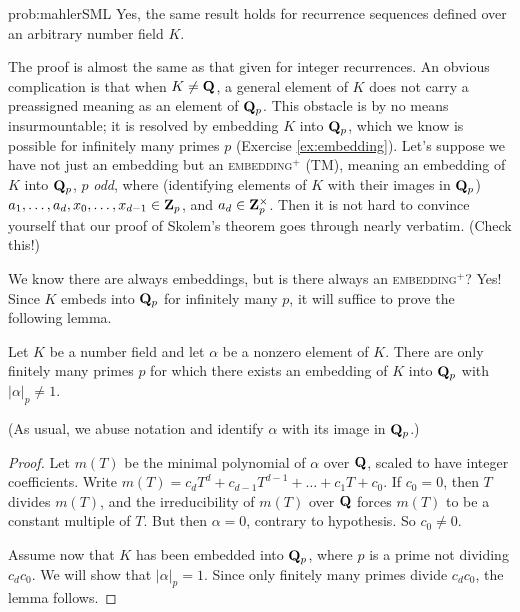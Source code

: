 \begin{sol}{prob:mahlerSML} Yes, the same result holds for recurrence sequences defined over an arbitrary number field $K$. 

The proof is almost the same as that given for integer recurrences.
An obvious complication is that when $K\ne \mathbf{Q}$, a general element of $K$ does not carry a preassigned meaning as an element of $\mathbf{Q}_p$. This obstacle is by no means insurmountable; it is resolved by embedding $K$ into $\mathbf{Q}_p$, which we know is possible for infinitely many primes $p$ (Exercise \ref{ex:embedding}). Let's suppose we have not just an embedding but an \textsc{embedding$^{+}$} (TM), meaning an embedding of $K$ into $\mathbf{Q}_p$, $p$ \emph{odd}, where (identifying elements of $K$ with their images in $\mathbf{Q}_p$) $a_1,\dots, a_d, x_0,\dots, x_{d-1} \in \mathbf{Z}_p$, and $a_d \in \mathbf{Z}_p^{\times}$. Then it is not hard to convince yourself that our proof of Skolem's theorem goes through nearly  verbatim. (Check this!)

We know there are always embeddings, but is there always an \textsc{embedding$^{+}$}? Yes! Since $K$ embeds into $\mathbf{Q}_p$ for infinitely many $p$, it will suffice to prove the following lemma.

\begin{lem} Let $K$ be a number field and let $\alpha$ be a nonzero element of $K$. There are only finitely many primes $p$ for which there exists an embedding of $K$ into $\mathbf{Q}_p$ with $|\alpha|_p\ne 1$. 
\end{lem}
(As usual, we abuse notation and identify $\alpha$ with its image in $\mathbf{Q}_p$.)

\begin{proof} Let $m(T)$ be the minimal polynomial of $\alpha$ over $\mathbf{Q}$, scaled to have integer coefficients. Write $m(T) = c_d T^d + c_{d-1} T^{d-1} + \dots + c_1 T + c_0$. If $c_0=0$, then $T$ divides $m(T)$, and the irreducibility of $m(T)$ over $\mathbf{Q}$ forces $m(T)$ to be a constant multiple of $T$. But then $\alpha=0$, contrary to hypothesis. So $c_0\ne 0$.

Assume now that $K$ has been embedded into $\mathbf{Q}_p$, where $p$ is a prime not dividing $c_d c_0$. We will show that $|\alpha|_p=1$. Since only finitely many primes divide $c_d c_0$, the lemma follows.


\end{proof}
\end{sol}
